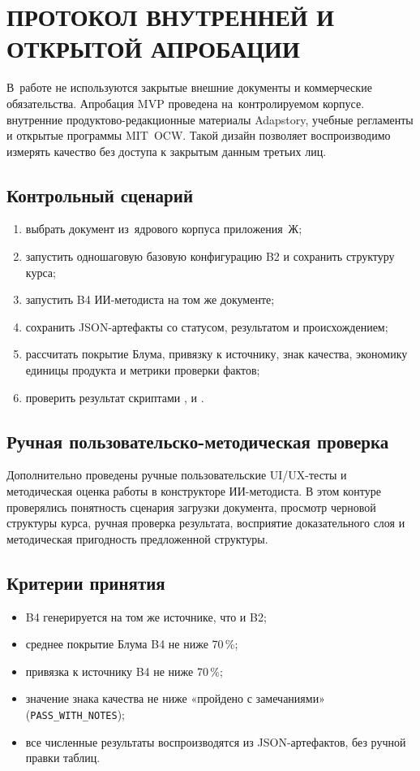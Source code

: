 \chapter{ПРОТОКОЛ ВНУТРЕННЕЙ И ОТКРЫТОЙ АПРОБАЦИИ}

В~работе не используются закрытые внешние документы и коммерческие
обязательства. Апробация MVP проведена на~контролируемом корпусе.
внутренние продуктово-редакционные материалы Adapstory, учебные
регламенты и открытые программы MIT~OCW. Такой дизайн позволяет
воспроизводимо измерять качество без доступа к закрытым данным
третьих лиц.

\section*{Контрольный сценарий}

\begin{enumerate}
  \item выбрать документ из~ядрового корпуса приложения~Ж;
  \item запустить одношаговую базовую конфигурацию B2 и сохранить структуру курса;
  \item запустить B4 ИИ-методиста на том же документе;
  \item сохранить JSON-артефакты со статусом, результатом и происхождением;
  \item рассчитать покрытие Блума, привязку к источнику, знак качества,
    экономику единицы продукта и метрики проверки фактов;
  \item проверить результат скриптами
    ,
     и
    .
\end{enumerate}

\section*{Ручная пользовательско-методическая проверка}

Дополнительно проведены ручные пользовательские UI/UX-тесты и
методическая оценка работы в конструкторе ИИ-методиста. В этом контуре
проверялись понятность сценария загрузки документа, просмотр черновой
структуры курса, ручная проверка результата, восприятие доказательного
слоя и методическая пригодность предложенной структуры.

\section*{Критерии принятия}

\begin{itemize}
  \item B4 генерируется на том же источнике, что и B2;
  \item среднее покрытие Блума B4 не ниже 70\,\%;
  \item привязка к источнику B4 не ниже 70\,\%;
  \item значение знака качества не ниже «пройдено с замечаниями»
    (\texttt{PASS\_WITH\_NOTES});
  \item все численные результаты воспроизводятся из JSON-артефактов,
    без ручной правки таблиц.
\end{itemize}
